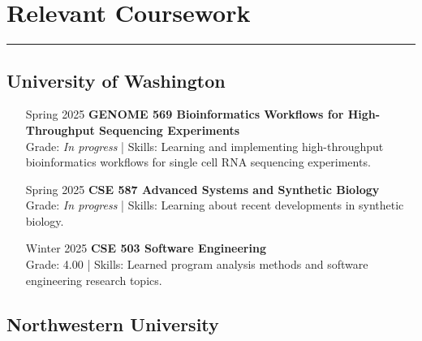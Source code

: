 \documentclass{article}
\begin{document}
\section*{Relevant Coursework}
\hrule
\vspace{10pt}

\subsection*{University of Washington}

\begin{itemize}[leftmargin=1.5in]
    \item[Spring 2025] \textbf{GENOME 569 Bioinformatics Workflows for High-Throughput Sequencing Experiments}\\
    Grade: \textit{In progress} | Skills: Learning and implementing high-throughput bioinformatics workflows for single cell RNA sequencing experiments.
    \item[Spring 2025] \textbf{CSE 587 Advanced Systems and Synthetic Biology}\\
    Grade: \textit{In progress} | Skills: Learning about recent developments in synthetic biology.
    \item[Winter 2025] \textbf{CSE 503 Software Engineering}\\
    Grade: 4.00 | Skills: Learned program analysis methods and software engineering research topics.
\end{itemize}

\subsection*{Northwestern University}
\end{document}

